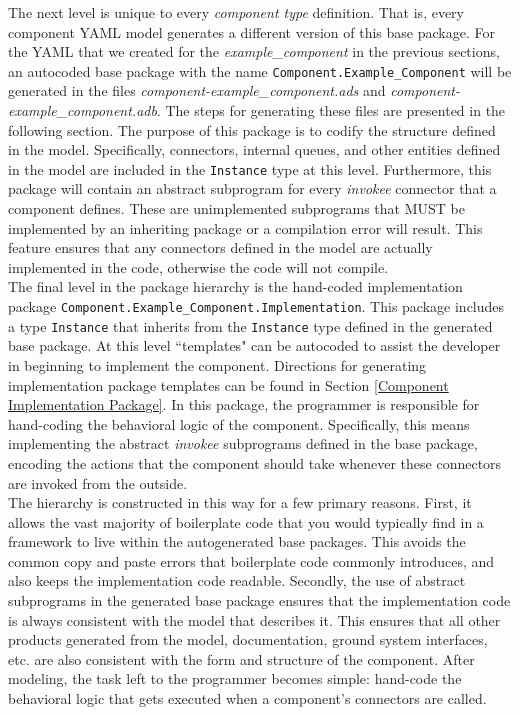 The next level is unique to every \textit{component type} definition. That is, every component YAML model generates a different version of this base package. For the YAML that we created for the \textit{example\_component} in the previous sections, an autocoded base package with the name \texttt{Component.Example\_Component} will be generated in the files \textit{component-example\_component.ads} and \textit{component-example\_component.adb}. The steps for generating these files are presented in the following section. The purpose of this package is to codify the structure defined in the model. Specifically, connectors, internal queues, and other entities defined in the model are included in the \texttt{Instance} type at this level. Furthermore, this package will contain an abstract subprogram for every \textit{invokee} connector that a component defines. These are unimplemented subprograms that MUST be implemented by an inheriting package or a compilation error will result. This feature ensures that any connectors defined in the model are actually implemented in the code, otherwise the code will not compile. \\

The final level in the package hierarchy is the hand-coded implementation package \texttt{Component.Example\_Component.Implementation}. This package includes a type \texttt{Instance} that inherits from the \texttt{Instance} type defined in the generated base package. At this level ``templates" can be autocoded to assist the developer in beginning to implement the component. Directions for generating implementation package templates can be found in Section \ref{Component Implementation Package}. In this package, the programmer is responsible for hand-coding the behavioral logic of the component. Specifically, this means implementing the abstract \textit{invokee} subprograms defined in the base package, encoding the actions that the component should take whenever these connectors are invoked from the outside. \\

The hierarchy is constructed in this way for a few primary reasons. First, it allows the vast majority of boilerplate code that you would typically find in a framework to live within the autogenerated base packages. This avoids the common copy and paste errors that boilerplate code commonly introduces, and also keeps the implementation code readable. Secondly, the use of abstract subprograms in the generated base package ensures that the implementation code is always consistent with the model that describes it. This ensures that all other products generated from the model, documentation, ground system interfaces, etc. are also consistent with the form and structure of the component. After modeling, the task left to the programmer becomes simple: hand-code the behavioral logic that gets executed when a component's connectors are called. \\

